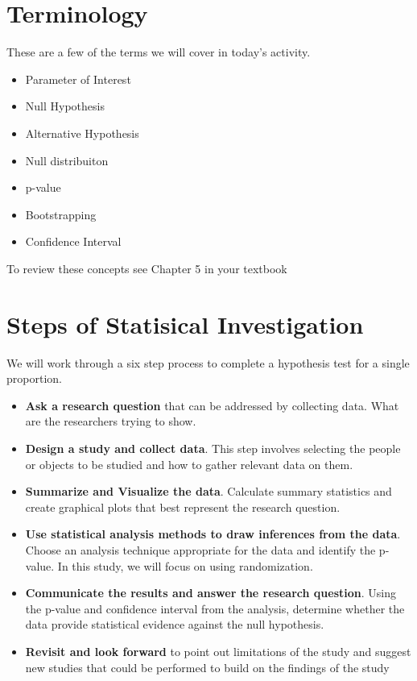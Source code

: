 \documentclass[
]{report}
\begin{document}
\hypertarget{terminology}{%
\section{Terminology}\label{terminology}}

These are a few of the terms we will cover in today's activity.

\begin{itemize}
\item
  Parameter of Interest
\item
  Null Hypothesis
\item
  Alternative Hypothesis
\item
  Null distribuiton
\item
  p-value
\item
  Bootstrapping
\item
  Confidence Interval
\end{itemize}

To review these concepts see Chapter 5 in your textbook

\hypertarget{steps-of-statisical-investigation}{%
\section{Steps of Statisical Investigation}\label{steps-of-statisical-investigation}}

We will work through a six step process to complete a hypothesis test for a single proportion.

\begin{itemize}
\item
  \textbf{Ask a research question} that can be addressed by collecting data. What are the researchers trying to show.
\item
  \textbf{Design a study and collect data}. This step involves selecting the people or objects to be studied and how to gather relevant data on them.
\item
  \textbf{Summarize and Visualize the data}. Calculate summary statistics and create graphical plots that best represent the research question.
\item
  \textbf{Use statistical analysis methods to draw inferences from the data}. Choose an analysis technique appropriate for the data and identify the p-value. In this study, we will focus on using randomization.
\item
  \textbf{Communicate the results and answer the research question}. Using the p-value and confidence interval from the analysis, determine whether the data provide statistical evidence against the null hypothesis.
\item
  \textbf{Revisit and look forward} to point out limitations of the study and suggest new studies that could be performed to build on the findings of the study
\end{itemize}
\end{document}
